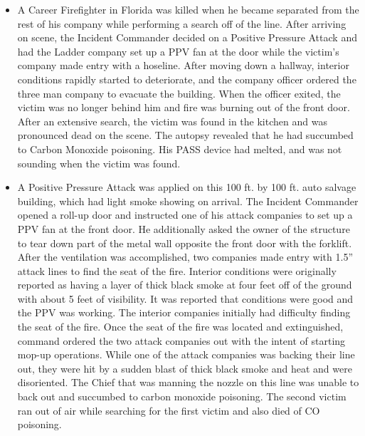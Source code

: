 \documentclass{article}
\begin{document}
\begin{itemize}

\item{A Career Firefighter in Florida was killed when he became separated from the rest of his company while performing a search off of the line. After arriving on scene, the Incident Commander decided on a Positive Pressure Attack and had the Ladder company set up a PPV fan at the door while the victim’s company made entry with a hoseline. After moving down a hallway, interior conditions rapidly started to deteriorate, and the company officer ordered the three man company to evacuate the building. When the officer exited, the victim was no longer behind him and fire was burning out of the front door.  After an extensive search, the victim was found in the kitchen and was pronounced dead on the scene. The autopsy revealed that he had succumbed to Carbon Monoxide poisoning. His PASS device had melted, and was not sounding when the victim was found.\cite{NIOSHF2000_44}\\}
	
\item {A Positive Pressure Attack was applied on this 100 ft. by 100 ft. auto salvage building, which had light smoke showing on arrival. The Incident Commander opened a roll-up door and instructed one of his attack companies to set up a PPV fan at the front door. He additionally asked the owner of the structure to tear down part of the metal wall opposite the front door with the forklift. After the ventilation was accomplished, two companies made entry with 1.5” attack lines to find the seat of the fire. Interior conditions were originally reported as having a layer of thick black smoke at four feet off of the ground with about 5 feet of visibility. It was reported that conditions were good and the PPV was working. The interior companies initially had difficulty finding the seat of the fire. Once the seat of the fire was located and extinguished, command ordered the two attack companies out with the intent of starting mop-up operations. While one of the attack companies was backing their line out, they were hit by a sudden blast of thick black smoke and heat and were disoriented. The Chief that was manning the nozzle on this line was unable to back out and succumbed to carbon monoxide poisoning. The second victim ran out of air while searching for the first victim and also died of CO poisoning.\cite{NIOSHF1998_32}\\}
	

\end{itemize}
\end{document}
